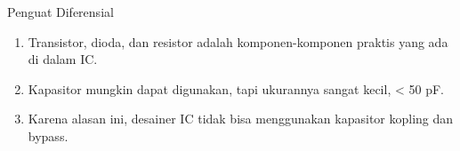 \documentclass[aspectratio=169]{beamer}
\begin{document}
\begin{frame}{Penguat Diferensial}
	\begin{enumerate}
		\item Transistor, dioda, dan resistor adalah komponen-komponen praktis yang ada di dalam IC.
		\item Kapasitor mungkin dapat digunakan, tapi ukurannya sangat kecil, < 50 pF.
		\item Karena alasan ini, desainer IC tidak bisa menggunakan kapasitor kopling dan bypass.
	\end{enumerate}
\end{frame}
\end{document}
